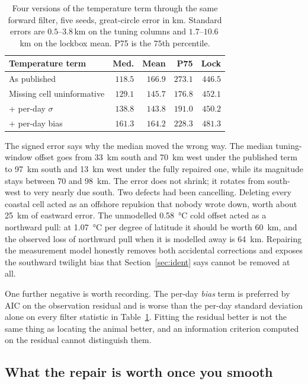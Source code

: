 \documentclass[conference]{IEEEtran}
\begin{document}
\begin{table}[t]
\caption{Four versions of the temperature term through the same forward filter,
five seeds, great-circle error in \si{\km}. Standard errors are
$0.5$--$3.8$\,\si{\km} on the tuning columns and $1.7$--$10.6$\,\si{\km} on the
lockbox mean. P75 is the $75$th percentile.}
\label{tab:sst}
\centering
\begin{tabular}{@{}lrrrr@{}}
\toprule
Temperature term & Med. & Mean & P75 & Lock \\
\midrule
As published                & $118.5$ & $166.9$ & $273.1$ & $446.5$ \\
Missing cell uninformative  & $129.1$ & $145.7$ & $176.8$ & $452.1$ \\
\quad + per-day $\sigma$    & $138.8$ & $143.8$ & $191.0$ & $450.2$ \\
\quad + per-day bias        & $161.3$ & $164.2$ & $228.3$ & $481.3$ \\
\bottomrule
\end{tabular}
\end{table}

The signed error says why the median moved the wrong way. The median
tuning-window offset goes from \SI{33}{\km} south and \SI{70}{\km} west under the
published term to \SI{97}{\km} south and \SI{13}{\km} west under the fully
repaired one, while its magnitude stays between $70$ and \SI{98}{\km}. The error
does not shrink; it rotates from south-west to very nearly due south. Two defects
had been cancelling. Deleting every coastal cell acted as an offshore repulsion
that nobody wrote down, worth about \SI{25}{\km} of eastward error. The
unmodelled \SI{0.58}{\celsius} cold offset acted as a northward pull: at
\SI{1.07}{\celsius} per degree of latitude it should be worth \SI{60}{\km}, and
the observed loss of northward pull when it is modelled away is \SI{64}{\km}.
Repairing the measurement model honestly removes both accidental corrections and
exposes the southward twilight bias that Section~\ref{sec:ident} says cannot be
removed at all.

One further negative is worth recording. The per-day \emph{bias} term is
preferred by AIC on the observation residual and is worse than the per-day
standard deviation alone on every filter statistic in Table~\ref{tab:sst}.
Fitting the residual better is not the same thing as locating the animal better,
and an information criterion computed on the residual cannot distinguish them.

\subsection{What the repair is worth once you smooth}
\end{document}

